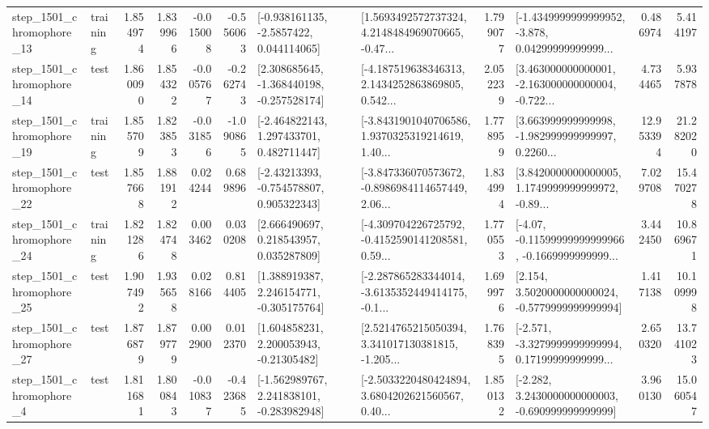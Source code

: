 \begin{tabular}{llrrrrllrlrr}
 step\_1501\_chromophore\_13 &  training &      1.854974 &    1.839966 &     -0.015008 & -0.556063 &     [-0.938161135, -2.5857422, 0.044114065] &  [1.5693492572737324, 4.2148484969070665, -0.47... &       1.799077 &  [-1.4349999999999952, -3.878, 0.04299999999999... &            0.486974 &          5.414197 \\
 step\_1501\_chromophore\_14 &      test &      1.860090 &    1.854322 &     -0.005767 & -0.262743 &   [2.308685645, -1.368440198, -0.257528174] &  [-4.187519638346313, 2.1434252863869805, 0.542... &       2.052239 &  [3.463000000000001, -2.163000000000004, -0.722... &            4.734465 &          5.937878 \\
 step\_1501\_chromophore\_19 &  training &      1.855709 &    1.823853 &     -0.031856 & -1.090865 &    [-2.464822143, 1.297433701, 0.482711447] &  [-3.8431901040706586, 1.9370325319214619, 1.40... &       1.778959 &  [3.663999999999998, -1.982999999999997, 0.2260... &           12.953394 &         21.282020 \\
 step\_1501\_chromophore\_22 &      test &      1.857668 &    1.881912 &      0.024244 &  0.689896 &    [-2.43213393, -0.754578807, 0.905322343] &  [-3.847336070573672, -0.8986984114657449, 2.06... &       1.834994 &  [3.8420000000000005, 1.1749999999999972, -0.89... &            7.029708 &         15.470278 \\
 step\_1501\_chromophore\_24 &  training &      1.821286 &    1.824748 &      0.003462 &  0.030208 &     [2.666490697, 0.218543957, 0.035287809] &  [-4.309704226725792, -0.4152590141208581, 0.59... &       1.770553 &  [-4.07, -0.11599999999999966, -0.1669999999999... &            3.442450 &         10.869671 \\
 step\_1501\_chromophore\_25 &      test &      1.907492 &    1.935658 &      0.028166 &  0.814405 &    [1.388919387, 2.246154771, -0.305175764] &  [-2.287865283344014, -3.6135352449414175, -0.1... &       1.699976 &   [2.154, 3.5020000000000024, -0.5779999999999994] &            1.417138 &         10.109998 \\
 step\_1501\_chromophore\_27 &      test &      1.876879 &    1.879779 &      0.002900 &  0.012370 &     [1.604858231, 2.200053943, -0.21305482] &  [2.5214765215050394, 3.341017130381815, -1.205... &       1.768395 &  [-2.571, -3.3279999999999994, 0.17199999999999... &            2.650320 &         13.741023 \\
  step\_1501\_chromophore\_4 &      test &      1.811681 &    1.800843 &     -0.010837 & -0.423685 &   [-1.562989767, 2.241838101, -0.283982948] &  [-2.5033220480424894, 3.6804202621560567, 0.40... &       1.850132 &   [-2.282, 3.2430000000000003, -0.690999999999999] &            3.960130 &         15.060547 \\

\end{tabular}
